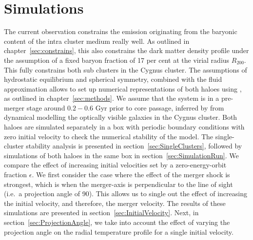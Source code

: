 \documentclass[MScProj_TLRH_ClusterEnergy.tex]{subfiles}
\begin{document}
\chapter{Simulations}
\label{sec:sim}

The current  observation constrains the emission originating 
from the baryonic content of the intra cluster medium really well. As outlined 
in chapter~\ref{sec:constrains}, this also constrains the dark matter density 
profile under the assumption of a fixed baryon fraction of 17 per cent at the 
virial radius $R_{200}$. This fully constrains both sub clusters in the Cygnus
cluster. The assumptions of hydrostatic equilibrium and spherical symmetry, 
combined with the fluid approximation allows to set up numerical representations
of both haloes using  \citep{2014MNRAS.438.1971D,
2016MNRAS.000.000D}, as outlined in chapter~\ref{sec:methods}. We assume that
the system is in a pre-merger stage around $0.2 - 0.6$ Gyr prior to core passage,
inferred by \citet{2005AJ....130...47L} from dynamical modelling the optically
visible galaxies in the Cygnus cluster. Both haloes are simulated separately
in a box with periodic boundary conditions with zero initial velocity to check
the numerical stability of the model. The single-cluster stability analysis is
presented in section~\ref{sec:SingleClusters}, followed by simulations of both
haloes in the same box in section~\ref{sec:SimulationRun}. We compare the effect
of increasing initial velocities set by a zero-energy-orbit fraction $\epsilon$.
We first consider the case where the effect of the merger shock is strongest,
which is when the merger-axis is perpendicular to the line of sight (i.e.~a 
projection angle of 90\deg). This allows us to single out the effect of increasing
the initial velocity, and therefore, the merger velocity. The results of these 
simulations are presented in section~\ref{sec:InitialVelocity}. Next, in 
section~\ref{sec:ProjectionAngle}, we take into account the effect of varying
the projection angle on the radial temperature profile for a single initial
velocity.
\end{document}
